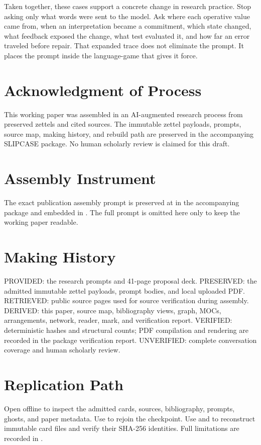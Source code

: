 \documentclass[11pt]{article}
\begin{document}
Taken together, these cases support a concrete change in research practice. Stop asking only what words were sent to the model. Ask where each operative value came from, when an interpretation became a commitment, which state changed, what feedback exposed the change, what test evaluated it, and how far an error traveled before repair. That expanded trace does not eliminate the prompt. It places the prompt inside the language-game that gives it force.

\section*{Acknowledgment of Process}
This working paper was assembled in an AI-augmented research process from preserved zettels and cited sources. The immutable zettel payloads, prompts, source map, making history, and rebuild path are preserved in the accompanying SLIPCASE package. No human scholarly review is claimed for this draft.




\appendix
\section{Assembly Instrument}
The exact publication assembly prompt is preserved at  in the accompanying package and embedded in . The full prompt is omitted here only to keep the working paper readable.

\section{Making History}
PROVIDED: the research prompts and 41-page proposal deck. PRESERVED: the admitted immutable zettel payloads, prompt bodies, and local uploaded PDF. RETRIEVED: public source pages used for source verification during assembly. DERIVED: this paper, source map, bibliography views, graph, MOCs, arrangements, network, reader, mark, and verification report. VERIFIED: deterministic hashes and structural counts; PDF compilation and rendering are recorded in the package verification report. UNVERIFIED: complete conversation coverage and human scholarly review.

\section{Replication Path}
Open  offline to inspect the admitted cards, sources, bibliography, prompts, ghosts, and paper metadata. Use  to rejoin the checkpoint. Use  and  to reconstruct immutable card files and verify their SHA-256 identities. Full limitations are recorded in .
\end{document}
